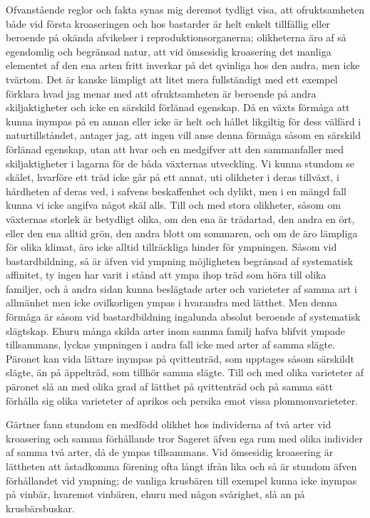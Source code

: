Ofvanstående reglor och fakta synas mig deremot tydligt visa, att ofruktsamheten både vid första kroaseringen och hos bastarder är helt enkelt tillfällig eller beroende på okända afvikelser i reproduktionsorganerna; olikheterna äro af så egendomlig och begränsad natur, att vid ömsesidig kroasering det manliga elementet af den ena arten fritt inverkar på det qvinliga hos den andra, men icke tvärtom. Det är kanske lämpligt att litet mera fullständigt med ett exempel förklara hvad jag menar med att ofruktsamheten är beroende på andra skiljaktigheter och icke en särskild förlänad egenskap. Då en växts förmåga att kunna inympas på en annan eller icke är helt och hållet likgiltig för dess välfärd i naturtillståndet, antager jag, att ingen vill anse denna förmåga såsom en särskild förlänad egenskap, utan att hvar och en medgifver att den sammanfaller med skiljaktigheter i lagarna för de båda växternas utveckling. Vi kunna stundom se skälet, hvarföre ett träd icke går på ett annat, uti olikheter i deras tillväxt, i hårdheten af deras ved, i safvens beskaffenhet och dylikt, men i en mängd fall kunna vi icke angifva något skäl alls. Till och med stora olikheter, såsom om växternas storlek är betydligt olika, om den ena är trädartad, den andra en ört, eller den ena alltid grön, den andra blott om sommaren, och om de äro lämpliga för olika klimat, äro icke alltid tillräckliga hinder för ympningen. Såsom vid bastardbildning, så är äfven vid ympning möjligheten begränsad af systematisk affinitet, ty ingen har varit i stånd att ympa ihop träd som höra till olika familjer, och å andra sidan kunna beslägtade arter och varieteter af samma art i allmänhet men icke ovilkorligen ympas i hvarandra med lätthet. Men denna förmåga är såsom vid bastardbildning ingalunda absolut beroende af systematisk slägtskap. Ehuru många skilda arter inom samma familj hafva blifvit ympade tillsammans, lyckas ympningen i andra fall icke med arter af samma slägte. Päronet kan vida lättare inympas på qvittenträd, som upptages såsom särskildt slägte, än på äppelträd, som tillhör samma slägte. Till och med olika varieteter af päronet slå an med olika grad af lätthet på qvittenträd och på samma sätt förhålla sig olika varieteter af aprikos och persika emot vissa plommonvarieteter.

Gärtner fann stundom en medfödd olikhet hos individerna af två arter vid kroasering och samma förhållande tror Sageret äfven ega rum med olika individer af samma två arter, då de ympas tillsammans. Vid ömsesidig kroasering är lättheten att åstadkomma förening ofta långt ifrån lika och så är stundom äfven förhållandet vid ympning; de vanliga krusbären till exempel kunna icke inympas på vinbär, hvaremot vinbären, ehuru med någon svårighet, slå an på krusbärsbuskar.

